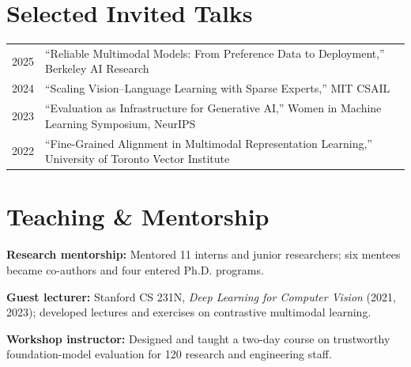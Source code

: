 \documentclass[10pt,letterpaper]{article}
\begin{document}
\section*{Selected Invited Talks}
\begin{tabularx}{\textwidth}{@{}p{0.67in}X@{}}
2025 & ``Reliable Multimodal Models: From Preference Data to Deployment,'' Berkeley AI Research \\
2024 & ``Scaling Vision--Language Learning with Sparse Experts,'' MIT CSAIL \\
2023 & ``Evaluation as Infrastructure for Generative AI,'' Women in Machine Learning Symposium, NeurIPS \\
2022 & ``Fine-Grained Alignment in Multimodal Representation Learning,'' University of Toronto Vector Institute \\
\end{tabularx}

\section*{Teaching \& Mentorship}
\textbf{Research mentorship:} Mentored 11 interns and junior researchers; six mentees became co-authors and four entered Ph.D. programs.\par
\textbf{Guest lecturer:} Stanford CS 231N, \textit{Deep Learning for Computer Vision} (2021, 2023); developed lectures and exercises on contrastive multimodal learning.\par
\textbf{Workshop instructor:} Designed and taught a two-day course on trustworthy foundation-model evaluation for 120 research and engineering staff.
\end{document}
